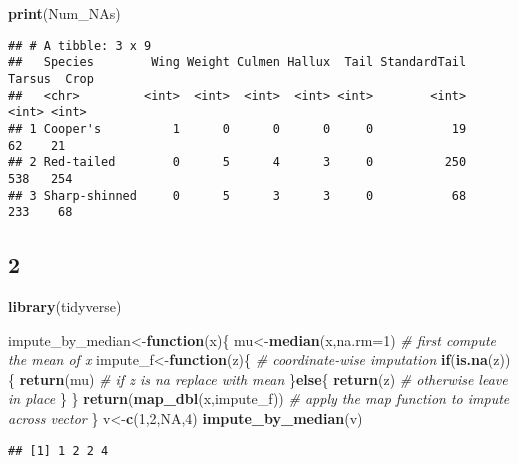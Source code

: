 \documentclass[
]{article}
\newenvironment{Shaded}{\begin{snugshade}}{\end{snugshade}}
\newcommand{\AttributeTok}[1]{\textcolor[rgb]{0.13,0.29,0.53}{#1}}
\newcommand{\CommentTok}[1]{\textcolor[rgb]{0.56,0.35,0.01}{\textit{#1}}}
\newcommand{\ConstantTok}[1]{\textcolor[rgb]{0.56,0.35,0.01}{#1}}
\newcommand{\ControlFlowTok}[1]{\textcolor[rgb]{0.13,0.29,0.53}{\textbf{#1}}}
\newcommand{\DecValTok}[1]{\textcolor[rgb]{0.00,0.00,0.81}{#1}}
\newcommand{\FunctionTok}[1]{\textcolor[rgb]{0.13,0.29,0.53}{\textbf{#1}}}
\newcommand{\NormalTok}[1]{#1}
\newcommand{\OtherTok}[1]{\textcolor[rgb]{0.56,0.35,0.01}{#1}}
\begin{document}
\begin{Shaded}
\begin{Highlighting}[]
\FunctionTok{print}\NormalTok{(Num\_NAs)}
\end{Highlighting}
\end{Shaded}

\begin{verbatim}
## # A tibble: 3 x 9
##   Species        Wing Weight Culmen Hallux  Tail StandardTail Tarsus  Crop
##   <chr>         <int>  <int>  <int>  <int> <int>        <int>  <int> <int>
## 1 Cooper's          1      0      0      0     0           19     62    21
## 2 Red-tailed        0      5      4      3     0          250    538   254
## 3 Sharp-shinned     0      5      3      3     0           68    233    68
\end{verbatim}

\hypertarget{section-2}{%
\subsection{2}\label{section-2}}

\begin{Shaded}
\begin{Highlighting}[]
\FunctionTok{library}\NormalTok{(tidyverse)}

\NormalTok{impute\_by\_median}\OtherTok{\textless{}{-}}\ControlFlowTok{function}\NormalTok{(x)\{}
\NormalTok{  mu}\OtherTok{\textless{}{-}}\FunctionTok{median}\NormalTok{(x,}\AttributeTok{na.rm=}\DecValTok{1}\NormalTok{) }\CommentTok{\# first compute the mean of x}
\NormalTok{  impute\_f}\OtherTok{\textless{}{-}}\ControlFlowTok{function}\NormalTok{(z)\{ }\CommentTok{\# coordinate{-}wise imputation}
    \ControlFlowTok{if}\NormalTok{(}\FunctionTok{is.na}\NormalTok{(z))\{}
      \FunctionTok{return}\NormalTok{(mu) }\CommentTok{\# if z is na replace with mean}
\NormalTok{    \}}\ControlFlowTok{else}\NormalTok{\{}
      \FunctionTok{return}\NormalTok{(z) }\CommentTok{\# otherwise leave in place}
\NormalTok{    \} \}}
\FunctionTok{return}\NormalTok{(}\FunctionTok{map\_dbl}\NormalTok{(x,impute\_f)) }\CommentTok{\# apply the map function to impute across vector}
\NormalTok{\}}
\NormalTok{v}\OtherTok{\textless{}{-}}\FunctionTok{c}\NormalTok{(}\DecValTok{1}\NormalTok{,}\DecValTok{2}\NormalTok{,}\ConstantTok{NA}\NormalTok{,}\DecValTok{4}\NormalTok{)}
\FunctionTok{impute\_by\_median}\NormalTok{(v)}
\end{Highlighting}
\end{Shaded}

\begin{verbatim}
## [1] 1 2 2 4
\end{verbatim}
\end{document}
